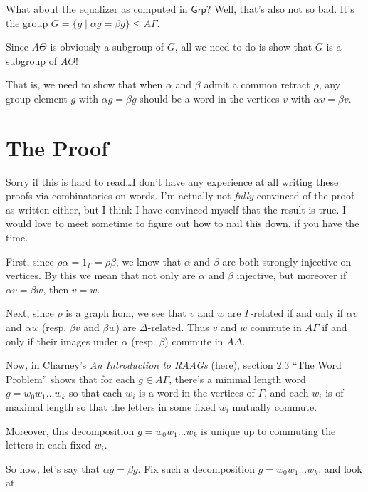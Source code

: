 \documentclass[12pt]{article}
\theoremstyle{definition}
\theoremstyle{theorem}
\begin{document}
What about the equalizer as computed in $\mathsf{Grp}$? Well, that's also not
so bad. It's the group $G = \{ g \mid \alpha g = \beta g \} \leq A\Gamma$.

Since $A\Theta$ is obviously a subgroup of $G$, all we need to do is show that 
$G$ is a subgroup of $A\Theta$! 

That is, we need to show that when 
$\alpha$ and $\beta$ admit a common retract $\rho$,
any group element $g$ with $\alpha g = \beta g$ should be a word in the
vertices $v$ with $\alpha v =  \beta v$.

\section{The Proof}

Sorry if this is hard to read\ldots I don't have any experience at all writing
these proofs via combinatorics on words. I'm actually not \emph{fully} convinced
of the proof as written either, but I think I have convinced myself that the
result is true. I would love to meet sometime to figure out how to nail this down,
if you have the time.

\bigskip

First, since $\rho \alpha = 1_\Gamma = \rho \beta$, we know that $\alpha$ and
$\beta$ are both strongly injective on vertices. By this we mean that not 
only are $\alpha$ and $\beta$ injective, but moreover if
$\alpha v = \beta w$, then $v = w$.

Next, since $\rho$ is a graph
hom, we see that $v$ and $w$ are $\Gamma$-related if and only if $\alpha v$
and $\alpha w$ (resp. $\beta v$ and $\beta w$) are $\Delta$-related. Thus 
$v$ and $w$ commute in $A \Gamma$ if and only if their images under $\alpha$
(resp. $\beta$) commute in $A \Delta$.

Now, in Charney's \emph{An Introduction to RAAGs} 
(\href{https://people.brandeis.edu/~charney/papers/RAAGfinal.pdf}{here}),
section $2.3$ ``The Word Problem'' shows that for each $g \in A\Gamma$,
there's a minimal length word $g = w_0 w_1 \ldots w_k$ so that each 
$w_i$ is a word in the vertices of $\Gamma$, and each $w_i$ is of maximal 
length so that the letters in some fixed $w_i$ mutually commute.

Moreover, this decomposition $g = w_0 w_1 \ldots w_k$ is unique up to 
commuting the letters in each fixed $w_i$.

So now, let's say that $\alpha g = \beta g$. Fix such a decomposition
$g = w_0 w_1 \ldots w_k$, and look at 
\end{document}
